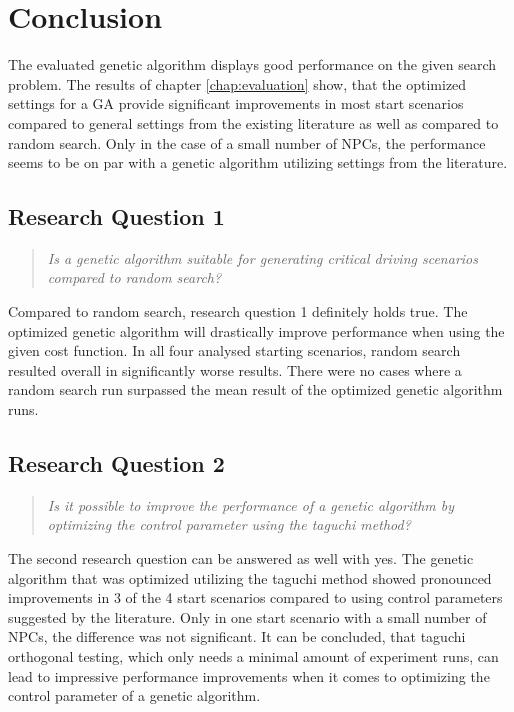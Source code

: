 \chapter{Conclusion}
The evaluated genetic algorithm displays good performance on the given search problem. The results of chapter \ref{chap:evaluation} show, that the optimized settings for a GA provide significant improvements in most start scenarios compared to general settings from the existing literature as well as compared to random search. Only in the case of a small number of NPCs, the performance seems to be on par with a genetic algorithm utilizing settings from the literature.

\section{Research Question 1}
\begin{quote}
	\begin{em}
		\textit{Is a genetic algorithm suitable for generating critical driving scenarios compared to random search?}
	\end{em}
\end{quote}

Compared to random search, research question 1 definitely holds true. The optimized genetic algorithm will drastically improve performance when using the given cost function. In all four analysed starting scenarios, random search resulted overall in significantly worse results. There were no cases where a random search run surpassed the mean result of the optimized genetic algorithm runs.

\section{Research Question 2}
\begin{quote}
	\begin{em}
		\textit{Is it possible to improve the performance of a genetic algorithm by optimizing the control parameter using the taguchi method?}
	\end{em}
\end{quote}

The second research question can be answered as well with yes. The genetic algorithm that was optimized utilizing the taguchi method showed pronounced improvements in 3 of the 4 start scenarios compared to using control parameters suggested by the literature. Only in one start scenario with a small number of NPCs, the difference was not significant. It can be concluded, that taguchi orthogonal testing, which only needs a minimal amount of experiment runs, can lead to impressive performance improvements when it comes to optimizing the control parameter of a genetic algorithm.
